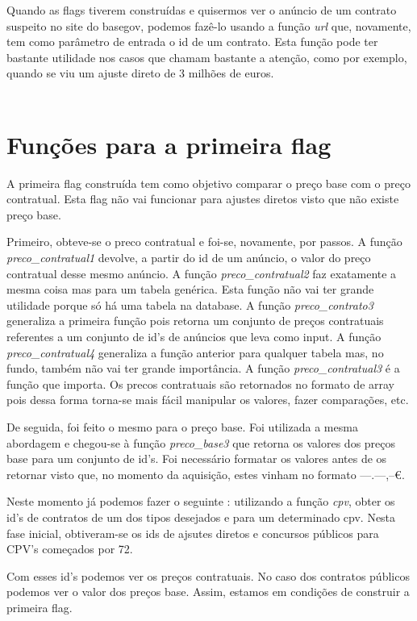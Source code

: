 Quando as flags tiverem construídas e quisermos ver o anúncio de um contrato suspeito no site do basegov, podemos fazê-lo usando a função \textit{url} que, novamente, tem como parâmetro de entrada o id de um contrato. Esta função pode ter bastante utilidade nos casos que chamam bastante a atenção, como por exemplo, quando se viu um ajuste direto de 3 milhões de euros. \\
\\

\section{Funções para a primeira flag}

A primeira flag construída tem como objetivo comparar o preço base com o preço contratual. Esta flag não vai funcionar para ajustes diretos visto que não existe preço base. 

Primeiro, obteve-se o preco contratual e foi-se, novamente, por passos. 
A função \textit{preco\_contratual1} devolve, a partir do id de um anúncio, o valor do preço contratual desse mesmo anúncio. A função \textit{preco\_contratual2} faz exatamente a mesma coisa mas para um tabela genérica. Esta função não vai ter grande utilidade porque só há uma tabela na database. A função \textit{preco\_contrato3} generaliza a primeira função pois retorna um conjunto de preços contratuais referentes a um conjunto de id's de anúncios que leva como input. A função \textit{preco\_contratual4} generaliza a função anterior para qualquer tabela mas, no fundo, também não vai ter grande importância. A função \textit{preco\_contratual3} é a função que importa. Os precos contratuais são retornados no formato de array pois dessa forma torna-se mais fácil manipular os valores, fazer comparações, etc. 

De seguida, foi feito o mesmo para o preço base. Foi utilizada a mesma abordagem e chegou-se à função \textit{preco\_base3} que retorna os valores dos preços base para um conjunto de id's. Foi necessário formatar os valores antes de os retornar visto que, no momento da aquisição, estes vinham no formato ---.---,--€. 

Neste momento já podemos fazer o seguinte : utilizando a função \textit{cpv}, obter os id's de contratos de um dos tipos desejados e para um determinado cpv. Nesta fase inicial, obtiveram-se os ids de ajsutes diretos e concursos públicos para CPV's começados por 72. 

Com esses id's podemos ver os preços contratuais. No caso dos contratos públicos podemos ver o valor dos preços base. Assim, estamos em condições de construir a primeira flag. 

